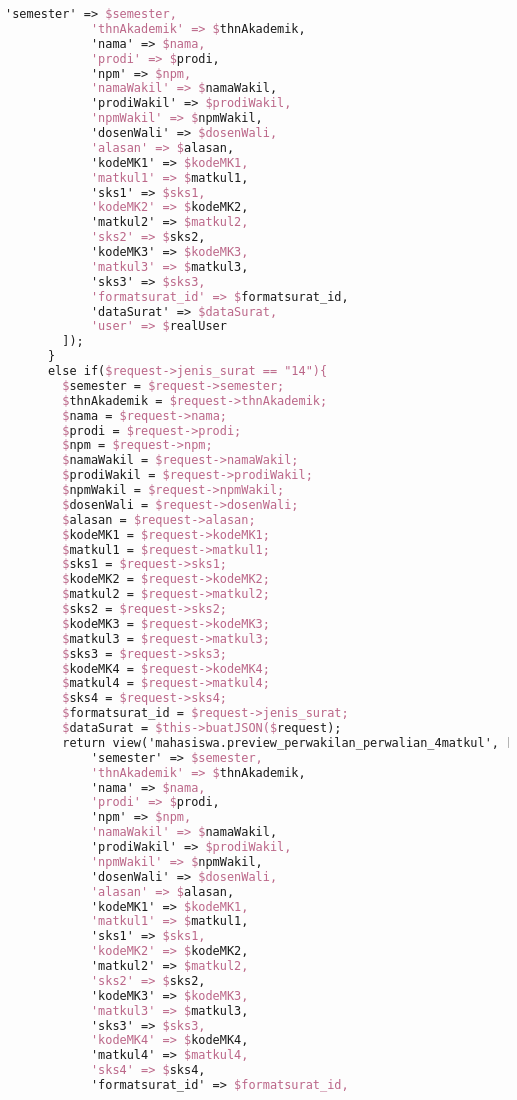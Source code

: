 \begin{lstlisting}[language=tex,basicstyle=\tiny,caption=PesanansuratController.php]
            'semester' => $semester,
            'thnAkademik' => $thnAkademik,
            'nama' => $nama,
            'prodi' => $prodi,
            'npm' => $npm,
            'namaWakil' => $namaWakil,
            'prodiWakil' => $prodiWakil,
            'npmWakil' => $npmWakil,
            'dosenWali' => $dosenWali,
            'alasan' => $alasan,
            'kodeMK1' => $kodeMK1,
            'matkul1' => $matkul1,
            'sks1' => $sks1,
            'kodeMK2' => $kodeMK2,
            'matkul2' => $matkul2,
            'sks2' => $sks2,
            'kodeMK3' => $kodeMK3,
            'matkul3' => $matkul3,
            'sks3' => $sks3,
            'formatsurat_id' => $formatsurat_id,
            'dataSurat' => $dataSurat,
            'user' => $realUser
        ]);
      }
      else if($request->jenis_surat == "14"){
        $semester = $request->semester;
        $thnAkademik = $request->thnAkademik;
        $nama = $request->nama;
        $prodi = $request->prodi;
        $npm = $request->npm;
        $namaWakil = $request->namaWakil;
        $prodiWakil = $request->prodiWakil;
        $npmWakil = $request->npmWakil;
        $dosenWali = $request->dosenWali;
        $alasan = $request->alasan;
        $kodeMK1 = $request->kodeMK1;
        $matkul1 = $request->matkul1;
        $sks1 = $request->sks1;
        $kodeMK2 = $request->kodeMK2;
        $matkul2 = $request->matkul2;
        $sks2 = $request->sks2;
        $kodeMK3 = $request->kodeMK3;
        $matkul3 = $request->matkul3;
        $sks3 = $request->sks3;
        $kodeMK4 = $request->kodeMK4;
        $matkul4 = $request->matkul4;
        $sks4 = $request->sks4;
        $formatsurat_id = $request->jenis_surat;
        $dataSurat = $this->buatJSON($request);
        return view('mahasiswa.preview_perwakilan_perwalian_4matkul', [
            'semester' => $semester,
            'thnAkademik' => $thnAkademik,
            'nama' => $nama,
            'prodi' => $prodi,
            'npm' => $npm,
            'namaWakil' => $namaWakil,
            'prodiWakil' => $prodiWakil,
            'npmWakil' => $npmWakil,
            'dosenWali' => $dosenWali,
            'alasan' => $alasan,
            'kodeMK1' => $kodeMK1,
            'matkul1' => $matkul1,
            'sks1' => $sks1,
            'kodeMK2' => $kodeMK2,
            'matkul2' => $matkul2,
            'sks2' => $sks2,
            'kodeMK3' => $kodeMK3,
            'matkul3' => $matkul3,
            'sks3' => $sks3,
            'kodeMK4' => $kodeMK4,
            'matkul4' => $matkul4,
            'sks4' => $sks4,
            'formatsurat_id' => $formatsurat_id,

\end{lstlisting}
